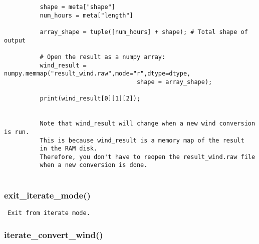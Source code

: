 \begin{verbatim}
          shape = meta["shape"]
          num_hours = meta["length"]

          array_shape = tuple([num_hours] + shape); # Total shape of output

          # Open the result as a numpy array:
          wind_result = numpy.memmap("result_wind.raw",mode="r",dtype=dtype,
                                     shape = array_shape);

          print(wind_result[0][1][2]);


          Note that wind_result will change when a new wind conversion is run.
          This is because wind_result is a memory map of the result
          in the RAM disk.
          Therefore, you don't have to reopen the result_wind.raw file
          when a new conversion is done.
          
\end{verbatim}
\subsubsection{exit\_iterate\_mode()}


\begin{verbatim}
 Exit from iterate mode. 
\end{verbatim}
\subsubsection{iterate\_convert\_wind()}


